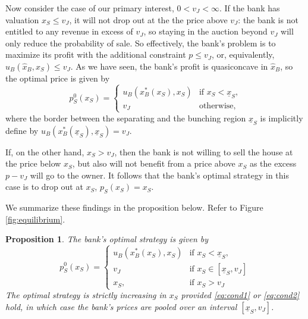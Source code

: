 \documentclass[11pt,twopage]{article}
\newcommand{\ul}{\underline}
\newtheorem{proposition}{Proposition}
{\bf}{\it}
\begin{document}
Now consider the case of our primary interest, $0<v_J<\infty$. If the
bank has valuation $x_S \leq v_J$, it will not drop out at the the
price above $v_J$: the bank is not entitled to any revenue in excess
of $v_J$, so staying in the auction beyond $v_J$ will only reduce the
probability of sale. So effectively, the bank's problem is to maximize
its profit with the additional constraint $p \leq v_J$, or,
equivalently, $u_B(\hat x_B,x_S) \leq v_J$. As we have seen, the
bank's profit is quasiconcave in $\hat x_B$, so the optimal price is
given by
\[
p_S^0(x_S)= \begin{cases}
  u_B(x_B^*(x_S),x_S) & \text{if $x_S<\ul x_S$,} \\
  v_J & \text{otherwise,}
\end{cases}
\]
where the border between the separating and the bunching region $\ul
x_S$ is implicitly define by $u_B(x_B^*(\ul x_S),\ul x_S)=v_J$.

If, on the other hand, $x_S>v_J$, then the bank is not willing to sell
the house at the price below $x_S$, but also will not benefit from a
price above $x_S$ as the excess $p - v_J$ will go to the owner. It
follows that the bank's optimal strategy in this case is to drop out
at $x_S$, $p_S(x_S) = x_S$.

We summarize these findings in the proposition below. Refer to Figure
\ref{fig:equilibrium}.
\begin{proposition}\label{prop:syminfo}
  The bank's optimal strategy is given by
  \[ p_S^0(x_S) =
  \begin{cases}
    u_B(x_B^*(x_S),x_S) & \text{if $x_S<\ul x_S$,} \\
    v_J & \text{if $x_S\in[\ul x_S,v_J]$} \\
    x_S, & \text{if $x_S > v_J$}
  \end{cases}
  \]
  The optimal strategy is strictly increasing in $x_S$ provided
  \eqref{eq:cond1} or \eqref{eq:cond2} hold, in which case the bank's
  prices are pooled over an interval $[\underline x_S, v_J]$.
\end{proposition}
 
\end{document}
